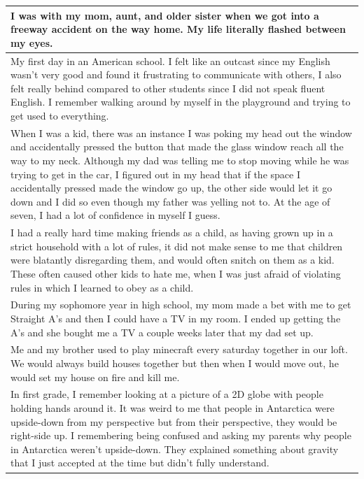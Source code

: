\documentclass[
  .7em,
  letterpaper,
  DIV=11,
  numbers=noendperiod]{scrartcl}
\begin{document}
\begin{table}
\begin{tabular}{l}
\hline
I was with my mom, aunt, and older sister when we got into a freeway accident on the way home. My life literally flashed between my eyes.\\
\hline
My first day in an American school. I felt like an outcast since my English wasn't very good and found it frustrating to communicate with others, I also felt really behind compared to other students since I did not speak fluent English. I remember walking around by myself in the playground and trying to get used to everything.\\
\hline
When I was a kid, there was an instance I was poking my head out the window and accidentally pressed the button that made the glass window reach all the way to my neck. Although my dad was telling me to stop moving while he was trying to get in the car, I figured out in my head that if the space I accidentally pressed made the window go up, the other side would let it go down and I did so even though my father was yelling not to. At the age of seven, I had a lot of confidence in myself I guess.\\
\hline
I had a really hard time making friends as a child, as having grown up in a strict household with a lot of rules, it did not make sense to me that children were blatantly disregarding them, and would often snitch on them as a kid. These often caused other kids to hate me, when I was just afraid of violating rules in which I learned to obey as a child.\\
\hline
During my sophomore year in high school, my mom made a bet with me to get Straight A's and then I could have a TV in my room. I ended up getting the A's and she bought me a TV a couple weeks later that my dad set up.\\
\hline
Me and my brother used to play minecraft every saturday together in our loft. We would always build houses together but then when I would move out, he would set my house on fire and kill me.\\
\hline
In first grade, I remember looking at a picture of a 2D globe with people holding hands around it. It was weird to me that people in Antarctica were upside-down from my perspective but from their perspective, they would be right-side up. I remembering being confused and asking my parents why people in Antarctica weren't upside-down. They explained something about gravity that I just accepted at the time but didn't fully understand.\\
\hline

\end{tabular}
\end{table}
\end{document}

